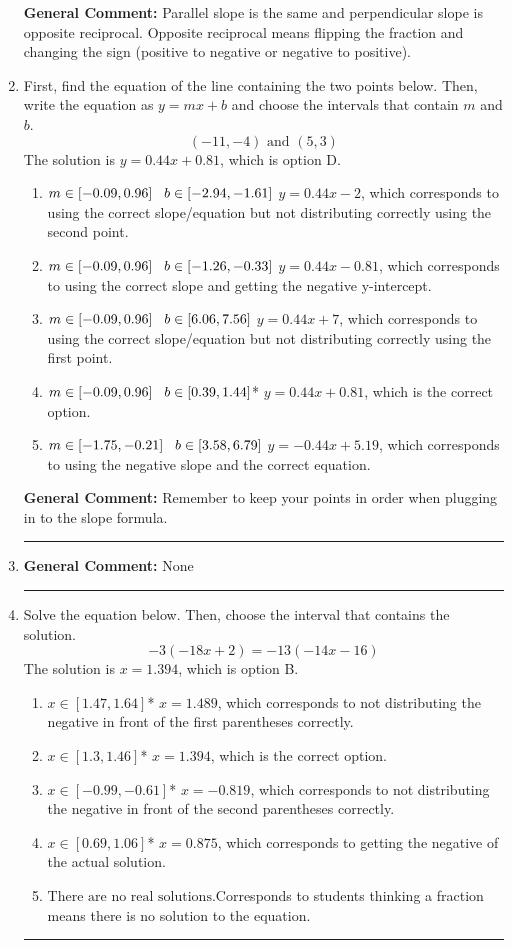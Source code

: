 \documentclass{extbook}[14pt]
\newcommand{\litem}[1]{\item#1\hspace*{-1cm}\rule{\textwidth}{0.4pt}}
\begin{document}
\begin{enumerate}
{\textbf{General Comment:} Parallel slope is the same and perpendicular slope is opposite reciprocal. Opposite reciprocal means flipping the fraction and changing the sign (positive to negative or negative to positive).
}
\litem{
First, find the equation of the line containing the two points below. Then, write the equation as $ y=mx+b $ and choose the intervals that contain $m$ and $b$.
\[ (-11, -4) \text{ and } (5, 3) \]
The solution is \( y = 0.44x + 0.81 \), which is option D.\begin{enumerate}[label=\Alph*.]
\item \( m \in [-0.09, 0.96] \hspace*{3mm} b \in [-2.94, -1.61] \) $y = 0.44x -2$, which corresponds to using the correct slope/equation but not distributing correctly using the second point.
\item \( m \in [-0.09, 0.96] \hspace*{3mm} b \in [-1.26, -0.33] \) $y = 0.44x -0.81$, which corresponds to using the correct slope and getting the negative y-intercept.
\item \( m \in [-0.09, 0.96] \hspace*{3mm} b \in [6.06, 7.56] \) $y = 0.44x + 7$, which corresponds to using the correct slope/equation but not distributing correctly using the first point.
\item \( m \in [-0.09, 0.96] \hspace*{3mm} b \in [0.39, 1.44] \)* $y = 0.44x + 0.81$, which is the correct option.
\item \( m \in [-1.75, -0.21] \hspace*{3mm} b \in [3.58, 6.79] \) $y = -0.44x + 5.19$, which corresponds to using the negative slope and the correct equation.
\end{enumerate}

\textbf{General Comment:} Remember to keep your points in order when plugging in to the slope formula.
}
\litem{



\textbf{General Comment:} None
}
\litem{
Solve the equation below. Then, choose the interval that contains the solution.
\[ -3(-18x + 2) = -13(-14x -16) \]
The solution is \( x = 1.394 \), which is option B.\begin{enumerate}[label=\Alph*.]
\item \( x \in [1.47, 1.64] \)* $x = 1.489$, which corresponds to not distributing the negative in front of the first parentheses correctly.
\item \( x \in [1.3, 1.46] \)* $x = 1.394$, which is the correct option.
\item \( x \in [-0.99, -0.61] \)* $x = -0.819$, which corresponds to not distributing the negative in front of the second parentheses correctly.
\item \( x \in [0.69, 1.06] \)* $x = 0.875$, which corresponds to getting the negative of the actual solution.
\item \( \text{There are no real solutions.} \)Corresponds to students thinking a fraction means there is no solution to the equation.
\end{enumerate}

}
\end{enumerate}
\end{document}
